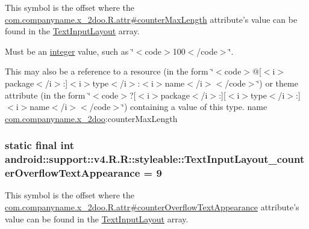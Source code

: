 This symbol is the offset where the \hyperlink{classcom_1_1companyname_1_1x__2doo_1_1_r_1_1attr_5c358a3029952d0802399d06ba3931d7}{com.companyname.x\_\-2doo.R.attr\#counterMaxLength} attribute's value can be found in the \hyperlink{classandroid_1_1support_1_1v4_1_1_r_1_1styleable_880beb171ce483ab1b63a82ef7f9d976}{TextInputLayout} array.

Must be an \hyperlink{classandroid_1_1support_1_1v4_1_1_r_1_1integer}{integer} value, such as \char`\"{}$<$code$>$100$<$/code$>$\char`\"{}. 

This may also be a reference to a resource (in the form \char`\"{}$<$code$>$@\mbox{[}$<$i$>$package$<$/i$>$:\mbox{]}$<$i$>$type$<$/i$>$:$<$i$>$name$<$/i$>$$<$/code$>$\char`\"{}) or theme attribute (in the form \char`\"{}$<$code$>$?\mbox{[}$<$i$>$package$<$/i$>$:\mbox{]}\mbox{[}$<$i$>$type$<$/i$>$:\mbox{]}$<$i$>$name$<$/i$>$$<$/code$>$\char`\"{}) containing a value of this type.  name \hyperlink{namespacecom_1_1companyname_1_1x__2doo}{com.companyname.x\_\-2doo}:counterMaxLength \hypertarget{classandroid_1_1support_1_1v4_1_1_r_1_1styleable_0666dd9e90421e9415028a87a4bfd4d3}{
\subsubsection[{TextInputLayout\_\-counterOverflowTextAppearance}]{\setlength{\rightskip}{0pt plus 5cm}static final int android::support::v4.R.R::styleable::TextInputLayout\_\-counterOverflowTextAppearance = 9}}
\label{classandroid_1_1support_1_1v4_1_1_r_1_1styleable_0666dd9e90421e9415028a87a4bfd4d3}


This symbol is the offset where the \hyperlink{classcom_1_1companyname_1_1x__2doo_1_1_r_1_1attr_dd1e934cbf2f7cdb22608f0bb3938a3e}{com.companyname.x\_\-2doo.R.attr\#counterOverflowTextAppearance} attribute's value can be found in the \hyperlink{classandroid_1_1support_1_1v4_1_1_r_1_1styleable_880beb171ce483ab1b63a82ef7f9d976}{TextInputLayout} array.

